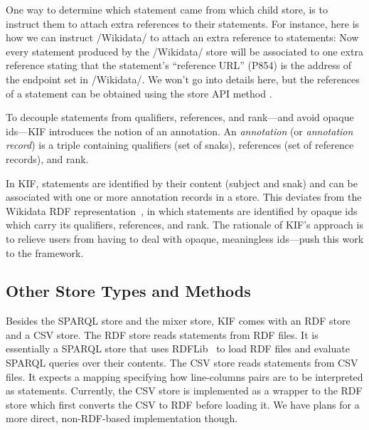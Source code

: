 

One way to determine which statement came from which child store, is to instruct them to attach extra references to their statements.
For instance, here is how we can instruct \code/Wikidata/ to attach an extra reference to statements:
%
Now every statement produced by the \code/Wikidata/ store will be associated to one extra reference stating that the statement's ``reference URL'' (P854) is the address of the endpoint set in \code/Wikidata/.
We won't go into details here, but the references of a statement can be obtained using the store API method .


To decouple statements from qualifiers, references, and rank---and avoid opaque ids---KIF introduces the notion of an annotation.
An \emph{annotation} (or \emph{annotation record}) is a triple containing qualifiers (set of snaks), references (set of reference records), and rank.


In KIF, statements are identified by their content (subject and snak) and can be associated with one or more annotation records in a store.
This deviates from the Wikidata RDF representation~\cite{Wikibase-RDF-Dump-Format}, in which statements are identified by opaque ids which carry its qualifiers, references, and rank.
The rationale of KIF's approach is to relieve users from having to deal with opaque, meaningless ids---push this work to the framework.


\subsection{Other Store Types and Methods}%
\label{sub:other-store-types-and-methods}


Besides the SPARQL store and the mixer store, KIF comes with an RDF store and a CSV store.
The RDF store reads statements from RDF files.
It is essentially a SPARQL store that uses RDFLib~\cite{RDFLib} to load RDF files and evaluate SPARQL queries over their contents.
The CSV store reads statements from CSV files.
It expects a mapping specifying how line-columns pairs are to be interpreted as statements.
Currently, the CSV store is implemented as a wrapper to the RDF store which first converts the CSV to RDF before loading it.
We have plans for a more direct, non-RDF-based implementation though.


